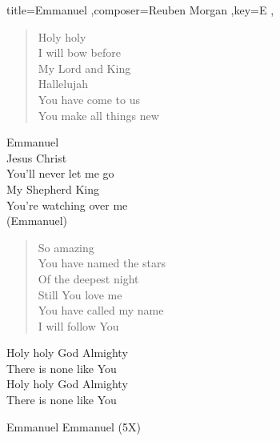 \documentclass[]{leadsheet}
\begin{document}
\begin{song}{title={Emmanuel
},composer={Reuben Morgan
},key={E
},}
\begin{verse}
Holy holy \\
I will bow before \\
My Lord and King \\
Hallelujah \\
You have come to us \\
You make all things new \\
\end{verse}

\begin{chorus}
Emmanuel \\
Jesus Christ \\
You'll never let me go \\
My Shepherd King \\
You're watching over me \\
(Emmanuel) \\
\end{chorus}

\begin{verse}
So amazing \\
You have named the stars \\
Of the deepest night \\
Still You love me \\
You have called my name \\
I will follow You \\
\end{verse}

\begin{bridge}
Holy holy God Almighty \\
There is none like You \\
Holy holy God Almighty \\
There is none like You \\
\end{bridge}

\begin{outro}
Emmanuel Emmanuel (5X) \\
\end{outro}

\end{song}
\end{document}
